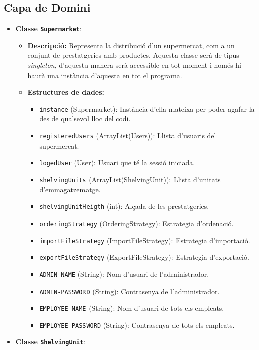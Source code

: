 \documentclass[a4paper,12pt]{report}
\begin{document}
\begin{itemize}
\subsection{Capa de Domini}
\begin{itemize}
\item \textbf{Classe \texttt{Supermarket}}:
		\begin{itemize}
			\item \textbf{Descripció:} Representa la distribució d'un supermercat, com a un conjunt de prestatgeries amb productes. Aquesta classe serà de tipus \textit{singleton}, d'aquesta manera serà accessible en tot moment i només hi haurà una instància d'aquesta en tot el programa.
			\item \textbf{Estructures de dades:}
				\begin{itemize}
					\item \texttt{instance} (Supermarket): Instància d'ella mateixa per poder agafar-la des de qualsevol lloc del codi.
					\item \texttt{registeredUsers} (ArrayList(Users)): Llista d'usuaris del supermercat.
					\item \texttt{logedUser} (User): Usuari que té la sessió iniciada.
					\item \texttt{shelvingUnits} (ArrayList(ShelvingUnit)): Llista d'unitats d'emmagatzematge.
					\item \texttt{shelvingUnitHeigth} (int): Alçada de les prestatgeries.
					\item \texttt{orderingStrategy} (OrderingStrategy): Estrategia d'ordenació.
					\item \texttt{importFileStrategy} (ImportFileStrategy): Estrategia d'importació.
					\item \texttt{exportFileStrategy} (ExportFileStrategy): Estrategia d'exportació.
					\item \texttt{ADMIN-NAME} (String): Nom d'usuari de l'administrador.
					\item \texttt{ADMIN-PASSWORD} (String): Contrasenya de l'administrador.
					\item \texttt{EMPLOYEE-NAME} (String): Nom d'usuari de tots els empleats.
					\item \texttt{EMPLOYEE-PASSWORD} (String): Contrasenya de tots els empleats.
				\end{itemize}
		\end{itemize}
\item \textbf{Classe \texttt{ShelvingUnit}}:
		\begin{itemize}

\end{itemize}
\end{itemize}
\end{itemize}
\end{document}
